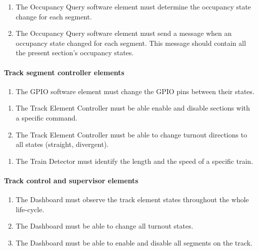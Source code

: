 \begin{enumerate}[label=REQ-OCQ-\arabic*, leftmargin=*, format=\small]
	\item The Occupancy Query software element must determine the occupancy state change for each segment.
	\item The Occupancy Query software element must send a message when an occupancy state changed for each segment. This message should contain all the present section's occupancy states.
\end{enumerate}

\paragraph{Track segment controller elements}
\begin{enumerate}[label=REQ-GPIO-\arabic*, leftmargin=*, format=\small]
	\item The GPIO software element must change the GPIO pins between their states.
\end{enumerate}

\begin{enumerate}[label=REQ-TEC-\arabic*, leftmargin=*, format=\small]
	\item The Track Element Controller must be able enable and disable sections with a specific command.
	\item The Track Element Controller must be able to change turnout directions to all states (straight, divergent).
\end{enumerate}

\begin{enumerate}[label=REQ-TD-\arabic*, leftmargin=*, format=\small]
	\item The Train Detector must identify the length and the speed of a specific train.
\end{enumerate}

\paragraph{Track control and supervisor elements}
\begin{enumerate}[label=REQ-DB-\arabic*, leftmargin=*, format=\small]
	\item The Dashboard must observe the track element states throughout the whole life-cycle.
	\item The Dashboard must be able to change all turnout states.
	\item The Dashboard must be able to enable and disable all segments on the track.
\end{enumerate}

